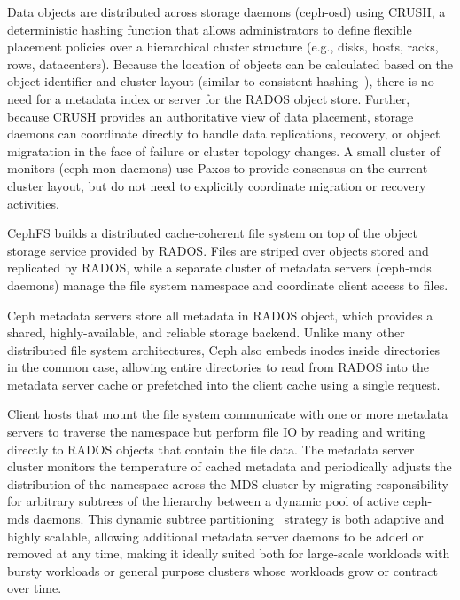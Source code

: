 Data objects are distributed across storage daemons (ceph-osd) using
CRUSH\cite{crush}, a deterministic hashing function that allows administrators
to define flexible placement policies over a hierarchical cluster structure
(e.g., disks, hosts, racks, rows, datacenters).  Because the location of
objects can be calculated based on the object identifier and cluster layout
(similar to consistent hashing~\cite{..}), there is no need for a metadata
index or server for the RADOS object store. Further, because CRUSH provides an
authoritative view of data placement, storage daemons can coordinate directly
to handle data replications, recovery, or object migratation in the face of
failure or cluster topology changes.  A small cluster of monitors (ceph-mon
daemons) use Paxos to provide consensus on the current cluster layout, but do
not need to explicitly coordinate migration or recovery activities.

CephFS builds a distributed cache-coherent file system on top of the object
storage service provided by RADOS.  Files are striped over objects stored and
replicated by RADOS, while a separate cluster of metadata servers (ceph-mds
daemons) manage the file system namespace and coordinate client access to
files.  

Ceph metadata servers store all metadata in RADOS object, which provides a
shared, highly-available, and reliable storage backend.  Unlike many other
distributed file system architectures, Ceph also embeds inodes inside
directories in the common case, allowing entire directories to read from RADOS
into the metadata server cache or prefetched into the client cache using a
single request.

Client hosts that mount the file system communicate with one or more metadata
servers to traverse the namespace but perform file IO by reading and writing
directly to RADOS objects that contain the file data.  The metadata server
cluster monitors the temperature of cached metadata and periodically adjusts
the distribution of the namespace across the MDS cluster by migrating
responsibility for arbitrary subtrees of the hierarchy between a dynamic pool
of active ceph-mds daemons.  This dynamic subtree partitioning~\cite{..}
strategy is both adaptive and highly scalable, allowing additional metadata
server daemons to be added or removed at any time, making it ideally suited
both for large-scale workloads with bursty workloads or general purpose
clusters whose workloads grow or contract over time.

